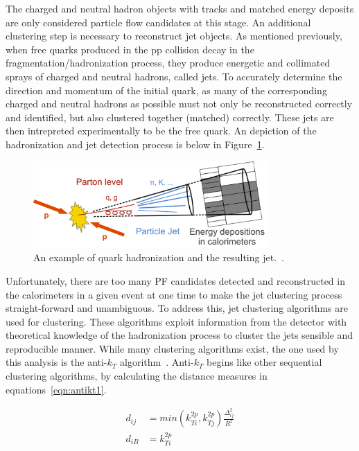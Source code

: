 The charged and neutral hadron objects with tracks and matched energy deposits are only considered particle flow candidates at this stage.
An additional clustering step is necessary to reconstruct jet objects. As mentioned previously, when free quarks produced in the pp collision decay in the
fragmentation/hadronization process, they produce energetic and collimated sprays of charged
and neutral hadrons, called jets. To accurately determine the direction and momentum of the initial quark, as many of the corresponding charged and neutral hadrons as possible must not only be
reconstructed correctly and identified, but also clustered together (matched) correctly.
These jets are then intrepreted experimentally to be the free quark. An depiction of the hadronization and jet detection process is below in Figure~\ref{fig:frag}.

\begin{figure}[hbtp]
 \begin{center}
   \includegraphics[width=0.8\textwidth]{ch4_figs/jet_frag.pdf}
   \caption{An example of quark hadronization and the resulting jet.~\cite{frag}.}
   \label{fig:frag}
 \end{center}
\end{figure}
 
Unfortunately, there are too many PF candidates detected and reconstructed in the calorimeters in a given event at one time to make the jet clustering process straight-forward
and unambiguous. To address this, jet clustering algorithms are used for clustering. These algorithms exploit information from the detector with theoretical knowledge of the
hadronization process to cluster the jets sensible and reproducible manner.
While many clustering algorithms exist, the one used by this analysis is the anti-$k_{T}$ algorithm~\cite{antikt}. Anti-$k_{T}$ begins like other sequential clustering algorithms,
by calculating the distance measures in equations~\ref{eqn:antikt1}. 

\begin{equation}
\begin{aligned}
\label{eqn:antikt1}
d_{ij} &= min(k^{2p}_{Ti},k^{2p}_{Tj})\frac{\Delta_{ij}^{2}}{R^{2}} \\ d_{iB} &= k^{2p}_{Ti}
\end{aligned} 
\end{equation}

